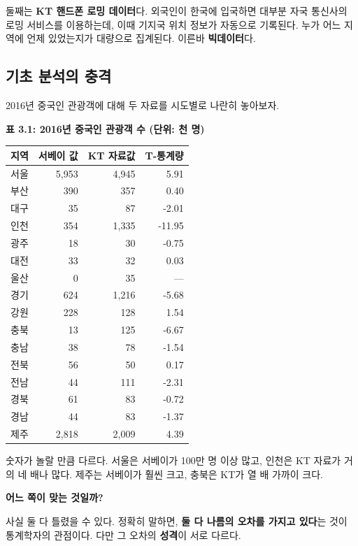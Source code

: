 \documentclass[
  letterpaper,
  DIV=11,
  numbers=noendperiod]{scrreprt}
\newcounter{none} %
\begin{document}
둘째는 \textbf{KT 핸드폰 로밍 데이터}다. 외국인이 한국에 입국하면 대부분
자국 통신사의 로밍 서비스를 이용하는데, 이때 기지국 위치 정보가 자동으로
기록된다. 누가 어느 지역에 언제 있었는지가 대량으로 집계된다. 이른바
\textbf{빅데이터}다.

\subsection{기초 분석의
충격}\label{uxae30uxcd08-uxbd84uxc11duxc758-uxcda9uxaca9}

2016년 중국인 관광객에 대해 두 자료를 시도별로 나란히 놓아보자.

\textbf{표 3.1: 2016년 중국인 관광객 수 (단위: 천 명)}

{\def\LTcaptype{none} %
\begin{longtable}[]{@{}lrrr@{}}
\toprule\noalign{}
지역 & 서베이 값 & KT 자료값 & T-통계량 \\
\midrule\noalign{}
\endhead
\bottomrule\noalign{}
\endlastfoot
서울 & 5,953 & 4,945 & 5.91 \\
부산 & 390 & 357 & 0.40 \\
대구 & 35 & 87 & -2.01 \\
인천 & 354 & 1,335 & -11.95 \\
광주 & 18 & 30 & -0.75 \\
대전 & 33 & 32 & 0.03 \\
울산 & 0 & 35 & --- \\
경기 & 624 & 1,216 & -5.68 \\
강원 & 228 & 128 & 1.54 \\
충북 & 13 & 125 & -6.67 \\
충남 & 38 & 78 & -1.54 \\
전북 & 56 & 50 & 0.17 \\
전남 & 44 & 111 & -2.31 \\
경북 & 61 & 83 & -0.72 \\
경남 & 44 & 83 & -1.37 \\
제주 & 2,818 & 2,009 & 4.39 \\
\end{longtable}
}

숫자가 놀랄 만큼 다르다. 서울은 서베이가 100만 명 이상 많고, 인천은 KT
자료가 거의 네 배나 많다. 제주는 서베이가 훨씬 크고, 충북은 KT가 열 배
가까이 크다.

\textbf{어느 쪽이 맞는 것일까?}

사실 둘 다 틀렸을 수 있다. 정확히 말하면, \textbf{둘 다 나름의 오차를
가지고 있다}는 것이 통계학자의 관점이다. 다만 그 오차의 \textbf{성격}이
서로 다르다.
\end{document}

